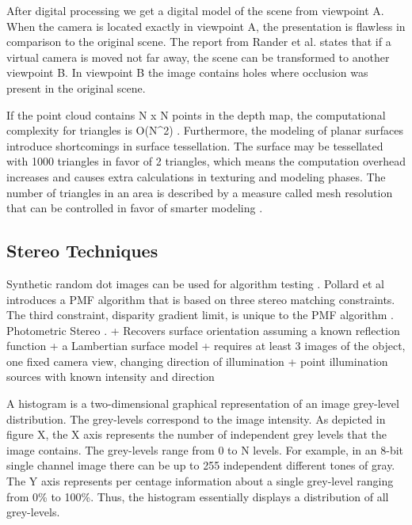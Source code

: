 \documentclass[12pt,a4paper,oneside,pdftex]{report}
\begin{document}
{After digital processing we get a digital model of the scene from viewpoint A. When the camera is located exactly in viewpoint A, the presentation is flawless in comparison to the original scene. The report from Rander et al. \cite{Rander97} states that if a virtual camera is moved not far away, the scene can be transformed to another viewpoint B. In viewpoint B the image contains holes where occlusion was present in the original scene.

If the point cloud contains N x N points in the depth map, the computational complexity for triangles is O(N^2) \cite{Rander97}. Furthermore, the modeling of planar surfaces introduce shortcomings in surface tessellation. The surface may be tessellated with 1000 triangles in favor of 2 triangles, which means the computation overhead increases and causes extra calculations in texturing and modeling phases. The number of triangles in an area is described by a measure called mesh resolution that can be controlled in favor of smarter modeling \cite{Johnson96}.






\subsection{Stereo Techniques}


Synthetic random dot images can be used for algorithm testing \cite{Zitnick00}.
Pollard et al introduces a PMF algorithm that is based on three stereo matching constraints. The third constraint, disparity gradient limit, is unique to the PMF algorithm \cite{Sonka07}.
Photometric Stereo \cite{Woodham80}.
    + Recovers surface orientation assuming a known reflection function
    + a Lambertian surface model
    + requires at least 3 images of the object, one fixed camera view, changing direction of illumination
    + point illumination sources with known intensity and direction



A histogram is a two-dimensional graphical representation of an image grey-level distribution. The grey-levels correspond to the image intensity. As depicted in figure X, the X axis represents the number of independent grey levels that the image contains. The grey-levels range from 0 to N levels. For example, in an 8-bit single channel image there can be up to 255 independent different tones of gray. The Y axis represents per centage information about a single grey-level ranging from 0\% to 100\%. Thus, the histogram essentially displays a distribution of all grey-levels.

}
\end{document}
